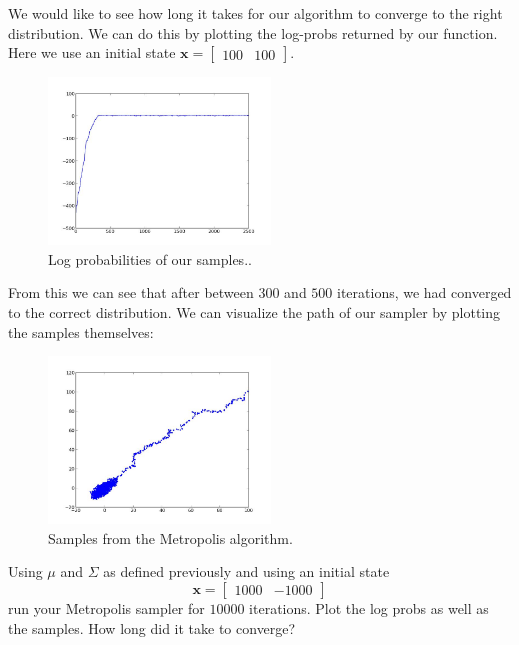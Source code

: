 We would like to see how long it takes for our algorithm to converge to the right distribution. We can do this by plotting the log-probs returned by our function. Here we use an initial state $\mathbf{x} = \left[\begin{array}{cc} 100 & 100 \end{array}\right]$.

\begin{figure}[h]
\begin{center}
\includegraphics[height=1.75in]{logprobs.jpeg}
\end{center}
\caption{Log probabilities of our samples..}
\end{figure}

From this we can see that after between $300$ and $500$ iterations, we had converged to the correct distribution. We can visualize the path of our sampler by plotting the samples themselves:

\begin{figure}[h]
\begin{center}
\includegraphics[height=1.75in]{samples.jpeg}
\end{center}
\caption{Samples from the Metropolis algorithm.}
\end{figure}

\begin{problem}
Using $\mu$ and $\Sigma$ as defined previously and using an initial state $$\mathbf{x} = \left[ \begin{array}{cc} 1000 & -1000 \end{array} \right]$$ run your Metropolis sampler for $10000$ iterations. Plot the log probs as well as the samples. How long did it take to converge?
\end{problem}